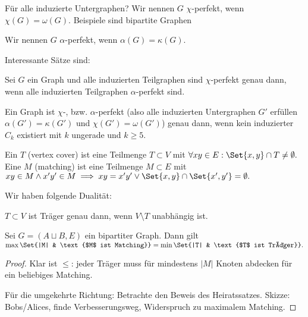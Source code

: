 Für alle induzierte Untergraphen?
Wir nennen $G$ $\chi$-perfekt, wenn $\chi(G) = \omega(G)$.
Beispiele sind bipartite Graphen

Wir nennen $G$ $\alpha$-perfekt, wenn $\alpha(G) = \kappa(G)$.

Interessante Sätze sind:

\begin{st}
    Sei $G$ ein Graph und alle induzierten Teilgraphen sind $\chi$-perfekt genau dann, wenn alle induzierten Teilgraphen $\alpha$-perfekt sind.
\end{st}

\begin{st}
    Ein Graph ist $\chi$-, bzw. $\alpha$-perfekt (also alle induzierten Untergraphen $G'$ erfüllen $\alpha(G') = \kappa(G')$ und $\chi(G') = \omega(G')$) genau dann, wenn kein induzierter $C_k$ existiert mit $k$ ungerade und $k \ge 5$.
\end{st}

\begin{df}
    Ein  $T$ (vertex cover) ist eine Teilmenge $T \subset V$ mit
    \begin{math}
        \forall xy \in E: \Set{x,y} \cap T \neq \emptyset.
    \end{math}
    Eine  $M$ (matching) ist eine Teilmenge $M \subset E$ mit
    \begin{math}
        xy \in M \land x'y' \in M \implies xy = x'y' \lor \Set{x,y} \cap \Set{x',y'} = \emptyset.
    \end{math}
\end{df}

Wir haben folgende Dualität:
\begin{lem}
    $T \subset V$ ist Träger genau dann, wenn $V \setminus T$ unabhängig ist.
\end{lem}

\begin{st}[König, 1931]
    Sei $G = (A \sqcup B, E)$ ein bipartiter Graph.
    Dann gilt
    \begin{math}
        \max\Set{|M| & \text{$M$ ist Matching}}
        = \min \Set{|T| & \text{$T$ ist Träger}}.
    \end{math}
    \begin{proof}
        Klar ist $\le$: jeder Träger muss für mindestens $|M|$ Knoten abdecken für ein beliebiges Matching.

        Für die umgekehrte Richtung: Betrachte den Beweis des Heiratssatzes.
        Skizze: Bobs/Alices, finde Verbesserungsweg, Widerspruch zu maximalem Matching.
    \end{proof}
\end{st}

